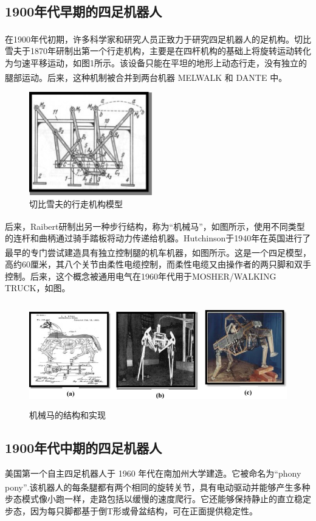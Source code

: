 \documentclass[12pt,a4paper]{ctexart}
\newcommand{\supercite}[1]{\textsuperscript{\cite{#1}}}
\begin{document}
\subsection{1900年代早期的四足机器人}
在1900年代初期，许多科学家和研究人员正致力于研究四足机器人的足机构\supercite{3}。切比雪夫于1870年研制出第一个行走机构，主要是在四杆机构的基础上将旋转运动转化为匀速平移运动，如图1所示。该设备只能在平坦的地形上动态行走，没有独立的腿部运动。后来，这种机制被合并到两台机器 MELWALK 和 DANTE \supercite{4}中。
\begin{figure}[H]
    \centering
    \includegraphics[height=4.5cm]{IMG_01.jpg}
    \caption{切比雪夫的行走机构模型}
\end{figure}
后来，Raibert研制出另一种步行结构，称为“机械马”\supercite{5}，如图所示，使用不同类型的连杆和曲柄通过骑手踏板将动力传递给机器。Hutchinson于1940年在英国进行了最早的专门尝试建造具有独立控制腿的机车机器\supercite{6}，如图所示。这是一个四足模型，高约60厘米，其八个关节由柔性电缆控制，而柔性电缆又由操作者的两只脚和双手控制。后来，这个概念被通用电气在1960年代用于MOSHER/WALKING TRUCK，如图。
\begin{figure}[H]
    \centering
    \includegraphics[height=4.5cm]{IMG_02.jpg}
    \caption{机械马的结构和实现}
\end{figure}
\subsection{1900年代中期的四足机器人}
美国第一个自主四足机器人于 1960 年代在南加州大学建造。它被命名为“phony pony”\supercite{7}.该机器人的每条腿都有两个相同的旋转关节，具有电动驱动并能够产生多种步态模式像小跑一样，走路包括以缓慢的速度爬行。它还能够保持静止的直立稳定步态，因为每只脚都基于倒T形或骨盆结构，可在正面提供稳定性。
\end{document}
